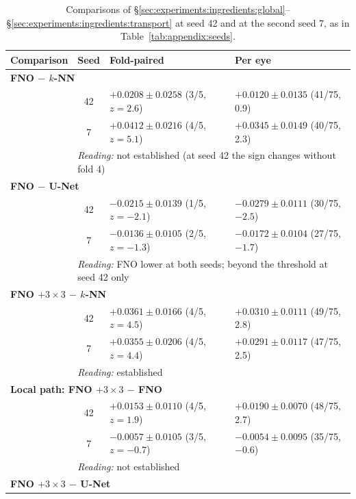 \begin{table}[!h]
  \centering
  \caption[Comparisons at both seeds, part 2.]{%
    Comparisons of
    \S\ref{sec:experiments:ingredients:global}--\S\ref{sec:experiments:ingredients:transport}
    at seed 42 and at the second seed 7, as in
    Table~\ref{tab:appendix:seeds}.}
  \label{tab:appendix:seeds-b}
  \footnotesize
  \begin{tabular}{l c l l}
    \toprule
    Comparison & Seed & Fold-paired & Per eye \\
    \midrule
    \multicolumn{4}{l}{\textbf{FNO $-$ $k$-NN}} \\
    & 42 & $+0.0208 \pm 0.0258$ (3/5, $z = 2.6$) & $+0.0120 \pm 0.0135$ (41/75, 0.9) \\
    & 7  & $+0.0412 \pm 0.0216$ (4/5, $z = 5.1$) & $+0.0345 \pm 0.0149$ (40/75, 2.3) \\
    & \multicolumn{3}{l}{\emph{Reading:} not established (at seed 42 the
      sign changes without fold 4)} \\[2pt]
    \multicolumn{4}{l}{\textbf{FNO $-$ U-Net}} \\
    & 42 & $-0.0215 \pm 0.0139$ (1/5, $z = -2.1$) & $-0.0279 \pm 0.0111$ (30/75, $-2.5$) \\
    & 7  & $-0.0136 \pm 0.0105$ (2/5, $z = -1.3$) & $-0.0172 \pm 0.0104$ (27/75, $-1.7$) \\
    & \multicolumn{3}{l}{\emph{Reading:} FNO lower at both seeds; beyond the
      threshold at seed 42 only} \\[2pt]
    \multicolumn{4}{l}{\textbf{FNO $+ 3{\times}3$ $-$ $k$-NN}} \\
    & 42 & $+0.0361 \pm 0.0166$ (4/5, $z = 4.5$) & $+0.0310 \pm 0.0111$ (49/75, 2.8) \\
    & 7  & $+0.0355 \pm 0.0206$ (4/5, $z = 4.4$) & $+0.0291 \pm 0.0117$ (47/75, 2.5) \\
    & \multicolumn{3}{l}{\emph{Reading:} established} \\[2pt]
    \multicolumn{4}{l}{\textbf{Local path: FNO $+ 3{\times}3$ $-$ FNO}} \\
    & 42 & $+0.0153 \pm 0.0110$ (4/5, $z = 1.9$) & $+0.0190 \pm 0.0070$ (48/75, 2.7) \\
    & 7  & $-0.0057 \pm 0.0105$ (3/5, $z = -0.7$) & $-0.0054 \pm 0.0095$ (35/75, $-0.6$) \\
    & \multicolumn{3}{l}{\emph{Reading:} not established} \\[2pt]
    \multicolumn{4}{l}{\textbf{FNO $+ 3{\times}3$ $-$ U-Net}} \\

\end{tabular}
\end{table}
